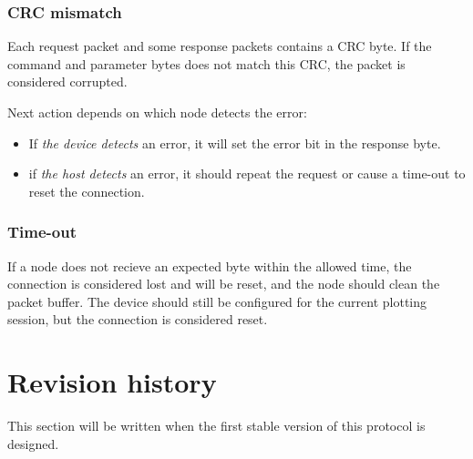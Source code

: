 \documentclass[11pt,a4paper,oneside]{memoir}
\begin{document}
\subsection{CRC mismatch}

Each request packet and some response packets contains a CRC byte. If
the command and parameter bytes does not match this CRC, the packet is
considered corrupted.

Next action depends on which node detects the error:
\begin{itemize} \firmlist
\item If \textit{the device detects} an error, it will set the error
  bit in the response byte.
\item if \textit{the host detects} an error, it should repeat the
  request or cause a time-out to reset the connection.
\end{itemize}

\subsection{Time-out}

If a node does not recieve an expected byte within the allowed time,
the connection is considered lost and will be reset, and the node
should clean the packet buffer. The device should still be configured
for the current plotting session, but the connection is considered
reset.



\chapter{Revision history}

This section will be written when the first stable version of this
protocol is designed.
\end{document}
